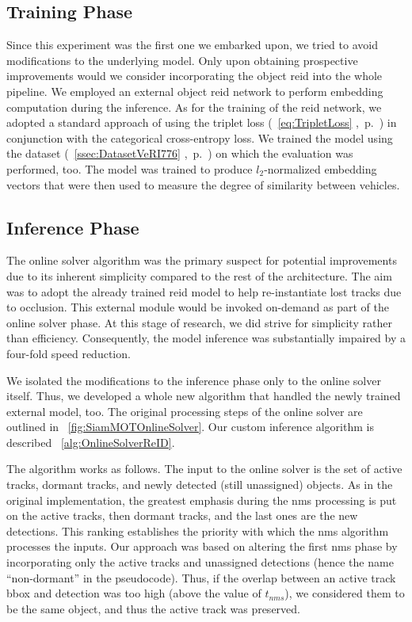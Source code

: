\subsection{Training Phase}

Since this experiment was the first one we embarked upon, we tried to avoid modifications to the underlying model. Only upon obtaining prospective improvements would we consider incorporating the object \gls{reid} into the whole pipeline. We employed an external object \gls{reid} network to perform embedding computation during the inference. As for the training of the \gls{reid} network, we adopted a standard approach of using the triplet loss (\eqtext{}~\ref{eq:TripletLoss} ,~p.~\pageref{eq:TripletLoss}) in conjunction with the categorical cross-entropy loss. We trained the model using the \verisss{} dataset (\sectiontext{}~\ref{ssec:DatasetVeRI776} ,~p.~\pageref{ssec:DatasetVeRI776}) on which the evaluation was performed, too. The model was trained to produce $l_2$-normalized embedding vectors that were then used to measure the degree of similarity between vehicles.

\subsection{Inference Phase}

The online solver algorithm was the primary suspect for potential improvements due to its inherent simplicity compared to the rest of the architecture. The aim was to adopt the already trained \gls{reid} model to help re-instantiate lost tracks due to occlusion. This external module would be invoked on-demand as part of the online solver phase. At this stage of research, we did strive for simplicity rather than efficiency. Consequently, the model inference was substantially impaired by a four-fold speed reduction.

We isolated the modifications to the inference phase only to the online solver itself. Thus, we developed a whole new algorithm that handled the newly trained external model, too. The original processing steps of the online solver are outlined in \figtext{}~\ref{fig:SiamMOTOnlineSolver}. Our custom inference algorithm is described \algtext{}~\ref{alg:OnlineSolverReID}.

The algorithm works as follows. The input to the online solver is the set of active tracks, dormant tracks, and newly detected (still unassigned) objects. As in the original implementation, the greatest emphasis during the \gls{nms} processing is put on the active tracks, then dormant tracks, and the last ones are the new detections. This ranking establishes the priority with which the \gls{nms} algorithm processes the inputs. Our approach was based on altering the first \gls{nms} phase by incorporating only the active tracks and unassigned detections (hence the name ``non-dormant'' in the pseudocode). Thus, if the overlap between an active track \gls{bbox} and detection was too high (above the value of $t_{nms}$), we considered them to be the same object, and thus the active track was preserved.

